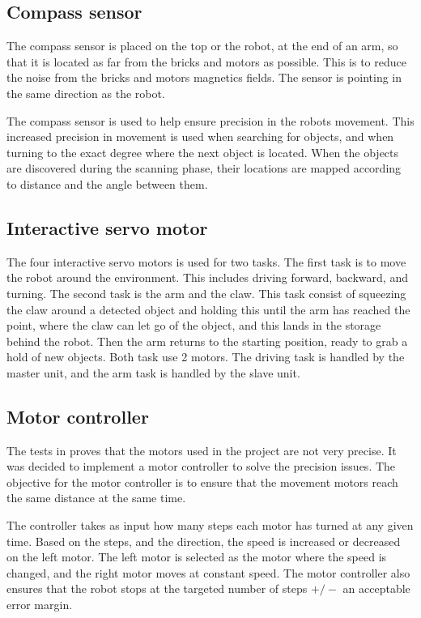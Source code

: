 \subsection{Compass sensor}
The compass sensor is placed on the top or the robot, at the end of an arm, so that it is located as far from the bricks and motors as possible. This is to reduce the noise from the bricks and motors magnetics fields. The sensor is pointing in the same direction as the robot.

The compass sensor is used to help ensure precision in the robots movement. This increased precision in movement is used when searching for objects, and when turning to the exact degree where the next object is located. When the objects are discovered during the scanning phase, their locations are mapped according to distance and the angle between them.

\subsection{Interactive servo motor}
The four interactive servo motors is used for two tasks. The first task is to move the robot around the environment. This includes driving forward, backward, and turning. The second task is the arm and the claw. This task consist of squeezing the claw around a detected object and holding this until the arm has reached the point, where the claw can let go of the object, and this lands in the storage behind the robot. Then the arm returns to the starting position, ready to grab a hold of new objects. Both task use 2 motors. The driving task is handled by the master unit, and the arm task is handled by the slave unit.

\subsection{Motor controller}\label{sec:design-motor-controller}
The tests in  proves that the motors used in the project are not very precise. It was decided to implement a motor controller to solve the precision issues. The objective for the motor controller is to ensure that the movement motors reach the same distance at the same time. 

The controller takes as input how many steps each motor has turned at any given time. Based on the steps, and the direction, the speed is increased or decreased on the left motor. The left motor is selected as the motor where the speed is changed, and the right motor moves at constant speed. The motor controller also ensures that the robot stops at the targeted number of steps $+/-$ an acceptable error margin.

